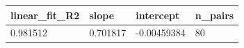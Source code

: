 \begin{tabular}{llll}
\toprule
linear\_fit\_R2 & slope & intercept & n\_pairs \\
\midrule
0.981512 & 0.701817 & -0.00459384 & 80 \\
\bottomrule
\end{tabular}
